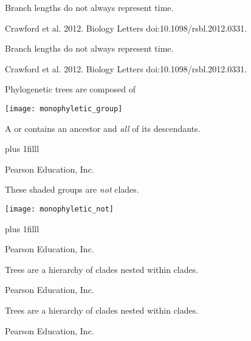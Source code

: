 \documentclass[t]{beamer}
\newcommand{\btVFill}{\vskip0pt plus 1filll}
\begin{document}
%
{
\begin{frame}[b]{Branch lengths do not always represent time.}

\hfill\tiny Crawford et al. 2012. Biology Letters doi:10.1098/rsbl.2012.0331.
\end{frame}
}
%
{
\begin{frame}[b]{Branch lengths do not always represent time.}

\hfill\tiny Crawford et al. 2012. Biology Letters doi:10.1098/rsbl.2012.0331.
\end{frame}
}
\begin{frame}[t]{Phylogenetic trees are composed of }

\begin{multicols}{2}

	\texttt{[image: monophyletic\_group]}

\columnbreak

	\hangpara A  or  contains an ancestor and \emph{all} of its descendants.

\end{multicols}

\btVFill

\tiny \textcopyright Pearson Education, Inc.
\end{frame}
%
\begin{frame}[t]{These shaded groups are \emph{not} clades.}

	\texttt{[image: monophyletic\_not]}

\btVFill

\tiny \textcopyright Pearson Education, Inc.
\end{frame}
%
{
\begin{frame}[b]{Trees are a hierarchy of clades nested within clades.}

\tiny \textcopyright Pearson Education, Inc.
\end{frame}
}
{
\begin{frame}[b]{Trees are a hierarchy of clades nested within clades.}

\tiny \textcopyright Pearson Education, Inc.
\end{frame}
}
\end{document}
